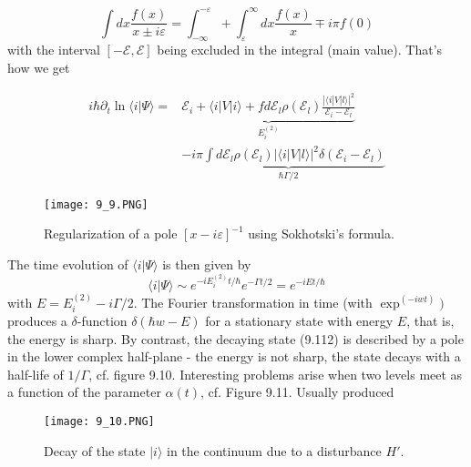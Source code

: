 \begin{equation}
    \int d x \frac{f(x)}{x \pm i \varepsilon}=\int_{-\infty}^{-\varepsilon}+\int_{\varepsilon}^{\infty} d x \frac{f(x)}{x} \mp i \pi f(0)
    \end{equation}
with the interval $[−\mathcal{E}, \mathcal{E}]$ being excluded in the integral (main value). That's how we get

\begin{equation}
\begin{aligned} i \hbar \partial_{t} \ln \langle i | \Psi\rangle=& \underbrace{\mathcal{E}_{i}+\langle i|V| i\rangle+ f d \mathcal{E}_{l} \rho\left(\mathcal{E}_{l}\right) \frac{|\langle i|V| l\rangle|^{2}}{\mathcal{E}_{i}-\mathcal{E}_{l}}}_{E_{i}^{(2)}} \\ &-\underbrace{i \pi \int d \mathcal{E}_{l} \rho\left(\mathcal{E}_{l}\right)|\langle i|V| l\rangle|^{2} \delta\left(\mathcal{E}_{i}-\mathcal{E}_{l}\right)}_{\hbar \Gamma / 2} \end{aligned}
\end{equation}
\begin{figure}[ht]
    \begin{minipage}{0.5\textwidth}
        \centering
        \texttt{[image: 9\_9.PNG]}
    \end{minipage}
    \begin{minipage}{0.5\textwidth}
        \caption{Regularization of a pole $[x − i\varepsilon] ^{−1}$ using Sokhotski's formula.}
    \end{minipage}
\end{figure}
The time evolution of $\langle i | \Psi\rangle$ is then given by
\begin{equation}
    \langle i | \Psi\rangle \sim e^{-i E_{i}^{(2)} t / \hbar} e^{-\Gamma t / 2}=e^{-i E t / \hbar}
    \end{equation}
with $E = E^{(2)}_i -i\Gamma / 2$. The Fourier transformation in time (with $\operatorname{exp}^{(-iwt)})$ produces a $\delta$-function $\delta(\hbar w-E)$ for a stationary state with energy $E$, that is, the energy is sharp. By contrast, the decaying state (9.112) is described by a pole in the lower complex half-plane - the energy is not sharp, the state decays with a half-life of $1 / \Gamma$, cf. figure 9.10. Interesting problems arise when two levels meet as a function of the parameter $\alpha(t)$, cf. Figure 9.11. Usually produced
\begin{figure}[ht]
    \begin{minipage}{0.5\textwidth}
        \centering
        \texttt{[image: 9\_10.PNG]}
    \end{minipage}
    \begin{minipage}{0.5\textwidth}
        \caption{Decay of the state $| i\rangle$ in the continuum due to a disturbance $H'$.}
    \end{minipage}
\end{figure}
